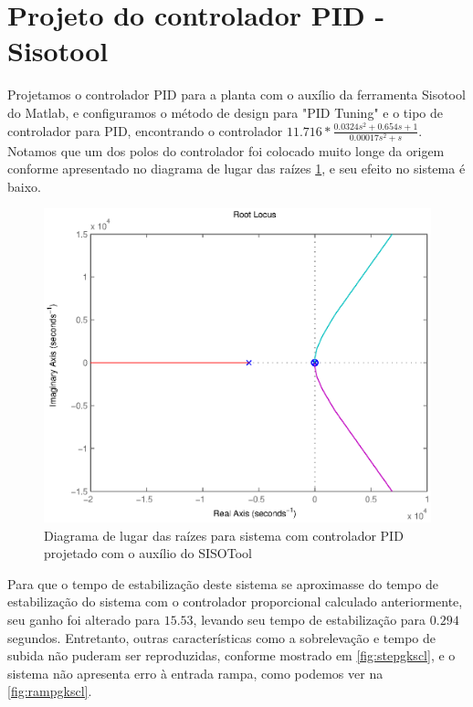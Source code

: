 \documentclass{article}
\begin{document}
\section{Projeto do controlador PID - Sisotool}
Projetamos o controlador PID para a planta com o auxílio da ferramenta Sisotool do Matlab, e configuramos o método de design para "PID Tuning" e o tipo de controlador para PID, encontrando o controlador $ 11.716*\frac{0.0324s^2 + 0.654s + 1}{0.00017s^2 + s}$. Notamos que um dos polos do controlador foi colocado muito longe da origem conforme apresentado no diagrama de lugar das raízes \ref{fig:rlocusGKs}, e seu efeito no sistema é baixo.
	\begin{figure}[H]
		\centering
		\includegraphics[width=\linewidth]{rlocusGKs}
		\caption{Diagrama de lugar das raízes para sistema com controlador PID projetado com o auxílio do SISOTool}
		\label{fig:rlocusGKs}
	\end{figure}
Para que o tempo de estabilização deste sistema se aproximasse do tempo de estabilização do sistema com o controlador proporcional calculado anteriormente, seu ganho foi alterado para $15.53$, levando seu tempo de estabilização para $0.294$ segundos. Entretanto, outras características como a sobrelevação e tempo de subida não puderam ser reproduzidas, conforme mostrado em \ref{fig:stepgkscl}, e o sistema não apresenta erro à entrada rampa, como podemos ver na \ref{fig:rampgkscl}.
\end{document}
